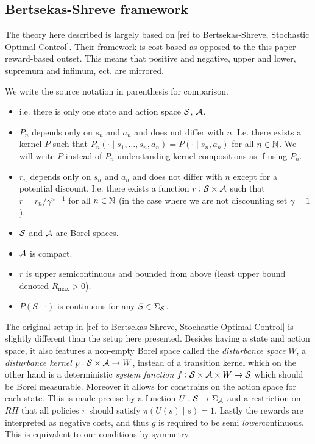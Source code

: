 \documentclass{article}
\begin{document}
\subsection{Bertsekas-Shreve framework}
The theory here described is largely based on
[ref to Bertsekas-Shreve, Stochastic Optimal Control].
Their framework is cost-based as opposed to the this paper reward-based outset.
This means that positive and negative, upper and lower, supremum and infimum,
ect. are mirrored.
\begin{sett}[BS]
  We write the source notation in parenthesis for comparison.
  \begin{itemize}
    \item {} i.e. there is only one state
      and action space $\mathcal{S}$, $\mathcal{A}$.
    \item $P_n$ depends only on $s_n$ and $a_n$ and does not
      differ with $n$. I.e. there exists a kernel $P$ such that
      $P_n(\cdot \mid s_1, \dots, s_n, a_n) = P(\cdot \mid s_n, a_n)$
      for all $n \in \mathbb{N}$. We will write $P$ instead of $P_n$ understanding
      kernel compositions as if using $P_n$.
    \item $r_n$ depends only on $s_n$ and $a_n$ and does not differ
      with $n$ except for a potential discount.
      I.e. there exists a function $r:\mathcal{S}\times\mathcal{A}$ such that
      $r = r_n/\gamma^{n-1}$ for all $n \in \mathbb{N}$ (in the case where we 
      are not discounting set $\gamma = 1$).
    \item $\mathcal{S}$ and $\mathcal{A}$ are Borel spaces.
    \item $\mathcal{A}$ is compact.
    \item $r$ is upper semicontinuous and bounded from above
      (least upper bound denoted $R_{\max} > 0$).
    \item $P(S \mid \cdot)$ is continuous for any $S \in \Sigma_{\mathcal{S}}$.
  \end{itemize}
  \label{sett:BS}
\end{sett}
The original setup in [ref to Bertsekas-Shreve, Stochastic Optimal Control]
is slightly different than the setup here presented.
Besides having a state and action space, it also features a 
non-empty Borel space called the
\emph{disturbance space} $W$, a \emph{disturbance kernel}
$p: \mathcal{S} \times \mathcal{A} \to W$,
instead of a transition kernel which on the other hand is a deterministic
\emph{system function} $f : \mathcal{S} \times \mathcal{A} \times W \to \mathcal{S}$
which should be Borel measurable.
Moreover it allows for constrains on the action space for each state.
This is made precise by a function $U:\mathcal{S} \to \Sigma_{\mathcal{A}}$
and a restriction on $R\Pi$ that all policies $\pi$ should satisfy
$\pi(U(s) \mid s) = 1$.
Lastly the rewards are interpreted as negative costs, and thus
$g$ is required to be semi \emph{lower}continuous.
This is equivalent to our conditions by symmetry.%
\end{document}
